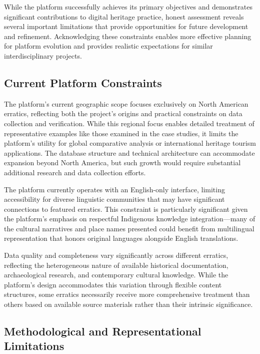 While the platform successfully achieves its primary objectives and demonstrates significant contributions to digital heritage practice, honest assessment reveals several important limitations that provide opportunities for future development and refinement. Acknowledging these constraints enables more effective planning for platform evolution and provides realistic expectations for similar interdisciplinary projects.

\subsection{Current Platform Constraints}
\label{subsec:platform_constraints}

The platform's current geographic scope focuses exclusively on North American erratics, reflecting both the project's origins and practical constraints on data collection and verification. While this regional focus enables detailed treatment of representative examples like those examined in the case studies, it limits the platform's utility for global comparative analysis or international heritage tourism applications. The database structure and technical architecture can accommodate expansion beyond North America, but such growth would require substantial additional research and data collection efforts.

The platform currently operates with an English-only interface, limiting accessibility for diverse linguistic communities that may have significant connections to featured erratics. This constraint is particularly significant given the platform's emphasis on respectful Indigenous knowledge integration—many of the cultural narratives and place names presented could benefit from multilingual representation that honors original languages alongside English translations.

Data quality and completeness vary significantly across different erratics, reflecting the heterogeneous nature of available historical documentation, archaeological research, and contemporary cultural knowledge. While the platform's design accommodates this variation through flexible content structures, some erratics necessarily receive more comprehensive treatment than others based on available source materials rather than their intrinsic significance.

\subsection{Methodological and Representational Limitations}
\label{subsec:methodological_limitations}

